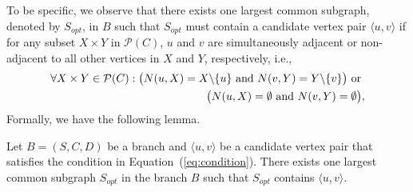 To be specific, we observe that there exists one largest common subgraph, denoted by $S_{opt}$, in $B$ such that $S_{opt}$ must contain a candidate vertex pair $\langle u,v \rangle$ if for any subset $X\times Y$ in $\mathcal{P}(C)$, $u$ and $v$ are simultaneously adjacent or non-adjacent to all other vertices in $X$ and $Y$, respectively, i.e.,
\begin{eqnarray}
    \label{eq:condition}
    \forall X\times Y\in \mathcal{P}(C): {\big(}N(u,X)=X\backslash\{u\} { \text{ and }} N(v,Y)=Y\backslash\{v\}{\big)} \text{ or }\nonumber\\  
        { \big(}N(u,X)=\emptyset {\text{ and }} N(v,Y)=\emptyset{\big)},
\end{eqnarray}
Formally, we have the following lemma.

\begin{lemma}
\label{lemma:maximality}
    Let $B=(S,C,D)$ be a branch {\chengC and $\langle u,v \rangle$ be a candidate vertex pair that satisfies the condition in Equation~(\ref{eq:condition}).} There exists one largest common subgraph $S_{opt}$ in the branch $B$ such that $S_{opt}$ contains 
    {\chengC $\langle u,v \rangle$.}
\end{lemma}


